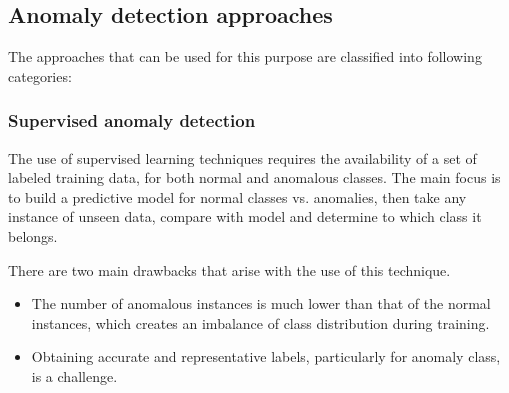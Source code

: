 \subsection{Anomaly detection approaches}

The approaches that can be used for this purpose are classified into following categories:

\subsubsection{Supervised anomaly detection}

The use of supervised learning techniques requires the availability of a set of labeled training data, for both normal and anomalous classes. The main focus is to build a predictive model for normal classes vs. anomalies, then take any instance of unseen data, compare with model and determine to which class it belongs.

\vspace{5mm} %

There are two main drawbacks that arise with the use of this technique.

\begin{itemize}

\item The number of anomalous instances is much lower than that of the normal instances, which creates an imbalance of class distribution during training.
\item Obtaining accurate and representative labels, particularly for anomaly class, is a challenge.
\end{itemize}

